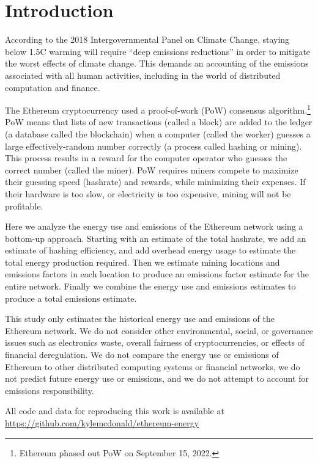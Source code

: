 
\section{Introduction}

According to the 2018 Intergovernmental Panel on Climate Change\cite{ipcc_annex_2014}, staying below 1.5{\textdegree}C warming will require ``deep emissions reductions'' in order to mitigate the worst effects of climate change. This demands an accounting of the emissions associated with all human activities, including in the world of distributed computation and finance.

The Ethereum cryptocurrency used a proof-of-work (PoW) consensus algorithm.\footnote{Ethereum phased out PoW on September 15, 2022.} PoW means that lists of new transactions (called a block) are added to the ledger (a database called the blockchain) when a computer (called the worker) guesses a large effectively-random number correctly (a process called hashing or mining). This process results in a reward for the computer operator who guesses the correct number (called the miner). PoW requires miners compete to maximize their guessing speed (hashrate) and rewards, while minimizing their expenses. If their hardware is too slow, or electricity is too expensive, mining will not be profitable.

Here we analyze the energy use and emissions of the Ethereum network using a bottom-up approach. Starting with an estimate of the total hashrate, we add an estimate of hashing efficiency, and add overhead energy usage to estimate the total energy production required. Then we estimate mining locations and emissions factors in each location to produce an emissions factor estimate for the entire network. Finally we combine the energy use and emissions estimates to produce a total emissions estimate. %

This study only estimates the historical energy use and emissions of the Ethereum network. We do not consider other environmental, social, or governance issues\cite{vries_true_2021} such as electronics waste, overall fairness of cryptocurrencies, or effects of financial deregulation. We do not compare the energy use or emissions of Ethereum to other distributed computing systems or financial networks, we do not predict future energy use or emissions, and we do not attempt to account for emissions responsibility.

All code and data for reproducing this work is available at \url{https://github.com/kylemcdonald/ethereum-energy}

